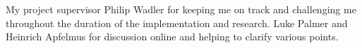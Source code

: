 \begin{acknowledgements}
  My project supervisor Philip Wadler for keeping me on track and challenging me throughout
  the duration of the implementation and research. Luke Palmer and Heinrich Apfelmus for discussion
  online and helping to clarify various points.
\end{acknowledgements}